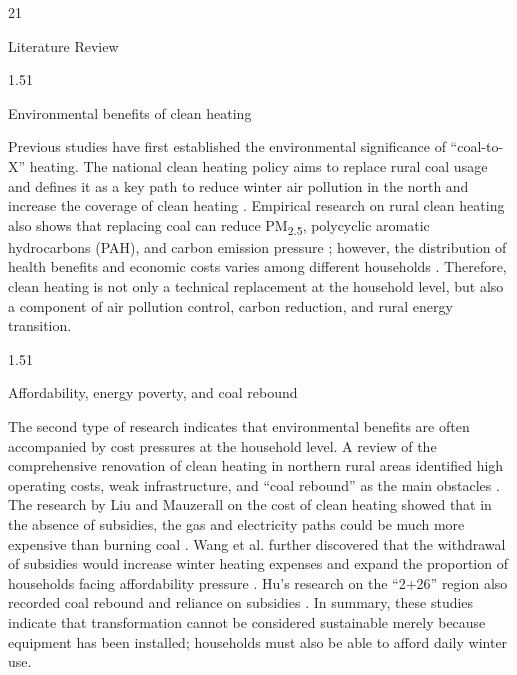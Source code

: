 \documentclass[stu,12pt,floatsintext,donotrepeattitle]{apa7}
\makeatletter
\newcommand{\Sanhao}{\fontsize{16pt}{20pt}\selectfont}
\newcommand{\Sihao}{\fontsize{14pt}{18pt}\selectfont}
\renewcommand{\section}{\@startsection{section}{1}{\z@}%
  {2\baselineskip}{1\baselineskip}%
  {\normalfont\Sanhao\bfseries\raggedright}}
\renewcommand{\subsection}{\@startsection{subsection}{2}{\z@}%
  {1.5\baselineskip}{1\baselineskip}%
  {\normalfont\Sihao\bfseries\raggedright}}
\makeatother
\begin{document}
\section{Literature Review}

\subsection{Environmental benefits of clean heating}

Previous studies have first established the environmental significance of ``coal-to-X'' heating. The national clean heating policy aims to replace rural coal usage and defines it as a key path to reduce winter air pollution in the north and increase the coverage of clean heating \cite{ndrc2017plan,li2025scatteredcoal}. Empirical research on rural clean heating also shows that replacing coal can reduce PM\textsubscript{2.5}, polycyclic aromatic hydrocarbons (PAH), and carbon emission pressure \cite{liu2025pahs,yuan2025carbon}; however, the distribution of health benefits and economic costs varies among different households \cite{zhang2024uneven}. Therefore, clean heating is not only a technical replacement at the household level, but also a component of air pollution control, carbon reduction, and rural energy transition.

\subsection{Affordability, energy poverty, and coal rebound}

The second type of research indicates that environmental benefits are often accompanied by cost pressures at the household level. A review of the comprehensive renovation of clean heating in northern rural areas identified high operating costs, weak infrastructure, and ``coal rebound'' as the main obstacles \cite{zhai2023review}. The research by Liu and Mauzerall on the cost of clean heating showed that in the absence of subsidies, the gas and electricity paths could be much more expensive than burning coal \cite{liu2020costs}. Wang et al. further discovered that the withdrawal of subsidies would increase winter heating expenses and expand the proportion of households facing affordability pressure \cite{zhao2024sustainable}. Hu's research on the ``2+26'' region also recorded coal rebound and reliance on subsidies \cite{hu2021decoalizing}. In summary, these studies indicate that transformation cannot be considered sustainable merely because equipment has been installed; households must also be able to afford daily winter use.
\end{document}

